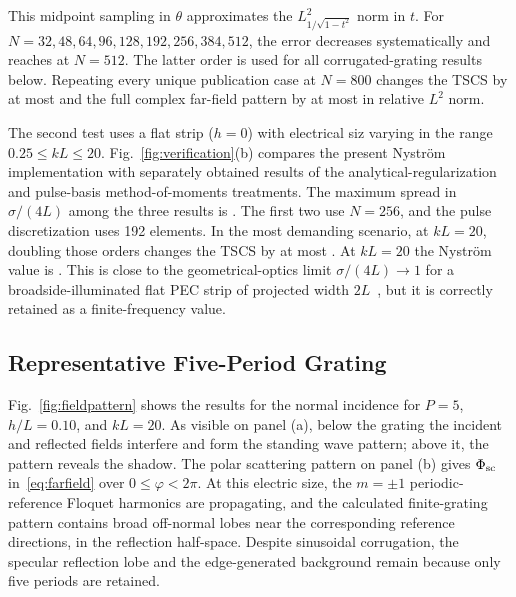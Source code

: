 \documentclass[conference]{IEEEtran}
\begin{document}
This midpoint sampling in $\theta$ approximates the
$L^2_{1/\sqrt{1-t^2}}$ norm in $t$.  For
$N=32,48,64,96,128,192,256,384,512$, the error decreases systematically and
reaches \ConvErrorNFiveTwelve at $N=512$.  The latter order is used for all
corrugated-grating results below.  Repeating every unique publication case at
$N=800$ changes the TSCS by at most \ProductionMaxTSCSChange and the full
complex far-field pattern by at most \ProductionMaxPatternChange in relative
$L^2$ norm.

The second test uses a flat strip ($h=0$) with electrical siz varying in the range
$0.25\leq kL\leq20$.  Fig.~\ref{fig:verification}(b) compares the present
Nystr\"om implementation with separately obtained results of the
analytical-regularization and pulse-basis method-of-moments treatments.  The
maximum spread in $\sigma/(4L)$ among the three results is \BackendMaxDiff.
The first two use $N=256$, and the pulse discretization uses 192 elements.
In the most demanding scenario, at $kL=20$, doubling those orders changes the
TSCS by at most \FlatOrderDoublingMaxChange.
At $kL=20$ the Nystr\"om value is
\FlatTSCSRatioTwenty.  This is close to the geometrical-optics limit
$\sigma/(4L)\to1$ for a broadside-illuminated flat PEC strip of projected
width $2L$~\cite{shapoval2011}, but it is correctly retained as a
finite-frequency value.

\subsection{Representative Five-Period Grating}

Fig.~\ref{fig:fieldpattern} shows the results for the normal incidence for
$P=5$, $h/L=0.10$, and $kL=20$.  As visible on panel (a), below the grating the 
incident and reflected fields interfere and form the standing wave pattern; above it, 
the pattern reveals the shadow.  The polar scattering pattern on panel (b) gives 
$\Phi_{\rm sc}$ in~\eqref{eq:farfield} over $0\leq\varphi<2\pi$.  At this
electric size, the $m=\pm1$ periodic-reference Floquet
harmonics are propagating, and the calculated finite-grating pattern contains
broad off-normal lobes near the corresponding reference directions, in the 
reflection half-space. Despite sinusoidal corrugation, the specular
reflection lobe and the edge-generated background remain because only five
periods are retained.

\enlargethispage{-1.25in}
\end{document}
